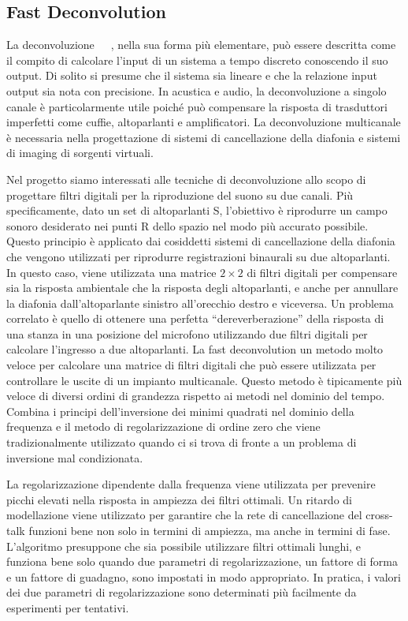 \documentclass[12pt,a4paper,titlepage]{article}
\begin{document}
\subsection{Fast Deconvolution}
\label{subsec:FD_teoria}
La deconvoluzione~\cite{kirkeby:deconvolution_regularization}~\cite{kirkeby:deconvolution_analysis}~\cite{kirkeby:deconvolution_design}, nella sua forma più elementare, può essere descritta come il compito di calcolare l'input di un sistema a tempo discreto conoscendo il suo output. Di solito si presume che il sistema sia lineare e che la relazione input output sia nota con precisione. In acustica e audio, la deconvoluzione a singolo canale è particolarmente utile poiché può compensare la risposta di trasduttori imperfetti come cuffie, altoparlanti e amplificatori. La deconvoluzione multicanale è necessaria nella progettazione di sistemi di cancellazione della diafonia e sistemi di imaging di sorgenti virtuali.%

Nel progetto siamo interessati alle tecniche di deconvoluzione allo scopo di progettare filtri digitali per la riproduzione del suono su due canali. Più specificamente, dato un set di altoparlanti S, l'obiettivo è riprodurre un campo sonoro desiderato nei punti R dello spazio nel modo più accurato possibile. Questo principio è applicato dai cosiddetti sistemi di cancellazione della diafonia che vengono utilizzati per riprodurre registrazioni binaurali su due altoparlanti. In questo caso, viene utilizzata una matrice $2 \times 2$ di filtri digitali per compensare sia la risposta ambientale che la risposta degli altoparlanti, e anche per annullare la diafonia dall'altoparlante sinistro all'orecchio destro e viceversa. Un problema correlato è quello di ottenere una perfetta ``dereverberazione'' della risposta di una stanza in una posizione del microfono utilizzando due filtri digitali per calcolare l'ingresso a due altoparlanti. La fast deconvolution un metodo molto veloce per calcolare una matrice di filtri digitali che può essere utilizzata per controllare le uscite di un impianto multicanale. Questo metodo è tipicamente più veloce di diversi ordini di grandezza rispetto ai metodi nel dominio del tempo. Combina i principi dell'inversione dei minimi quadrati nel dominio della frequenza e il metodo di regolarizzazione di ordine zero che viene tradizionalmente utilizzato quando ci si trova di fronte a un problema di inversione mal condizionata.%

La regolarizzazione dipendente dalla frequenza viene utilizzata per prevenire picchi elevati nella risposta in ampiezza dei filtri ottimali. Un ritardo di modellazione viene utilizzato per garantire che la rete di cancellazione del cross-talk funzioni bene non solo in termini di ampiezza, ma anche in termini di fase. L'algoritmo presuppone che sia possibile utilizzare filtri ottimali lunghi, e funziona bene solo quando due parametri di regolarizzazione, un fattore di forma e un fattore di guadagno, sono impostati in modo appropriato. In pratica, i valori dei due parametri di regolarizzazione sono determinati più facilmente da esperimenti per tentativi.%
\end{document}
